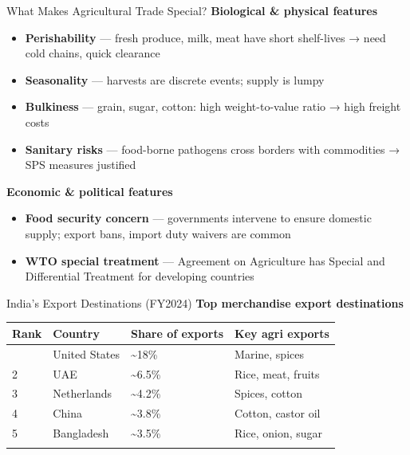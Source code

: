 \documentclass[
  ignorenonframetext,
  aspectratio=169,
]{beamer}
\makeatletter
\providecommand{\tightlist}{%
  \setlength{\itemsep}{0pt}\setlength{\parskip}{0pt}}
\let\quarto@originallabel\label
\DeclareRobustCommand*{\label}[1]{\quarto@originallabel{#1}}
\makeatother
\begin{document}
\begin{frame}{What Makes Agricultural Trade Special?}
\label{what-makes-agricultural-trade-special}
\textbf{Biological \& physical features}

\begin{itemize}
\tightlist
\item
  \textbf{Perishability} --- fresh produce, milk, meat have short
  shelf-lives → need cold chains, quick clearance
\item
  \textbf{Seasonality} --- harvests are discrete events; supply is lumpy
\item
  \textbf{Bulkiness} --- grain, sugar, cotton: high weight-to-value
  ratio → high freight costs
\item
  \textbf{Sanitary risks} --- food-borne pathogens cross borders with
  commodities → SPS measures justified
\end{itemize}

\textbf{Economic \& political features}

\begin{itemize}
\tightlist
\item
  \textbf{Food security concern} --- governments intervene to ensure
  domestic supply; export bans, import duty waivers are common
\item
  \textbf{WTO special treatment} --- Agreement on Agriculture has
  Special and Differential Treatment for developing countries
\end{itemize}

\end{frame}

\begin{frame}{India's Export Destinations (FY2024)}
\label{indias-export-destinations-fy2024}
\textbf{Top merchandise export destinations}

\begin{longtable}[]{@{}llll@{}}
\toprule\noalign{}
Rank & Country & Share of exports & Key agri exports \\
\midrule\noalign{}
\endhead
1 & United States & \textasciitilde18\% & Marine, spices \\
2 & UAE & \textasciitilde6.5\% & Rice, meat, fruits \\
3 & Netherlands & \textasciitilde4.2\% & Spices, cotton \\
4 & China & \textasciitilde3.8\% & Cotton, castor oil \\
5 & Bangladesh & \textasciitilde3.5\% & Rice, onion, sugar \\
\bottomrule\noalign{}
\end{longtable}

\end{frame}
\end{document}
